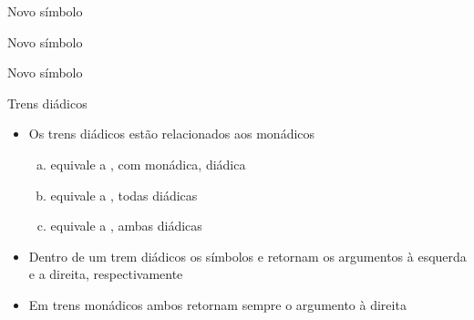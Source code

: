 \begin{frame}[fragile]{Novo símbolo}


\end{frame}

\begin{frame}[fragile]{Novo símbolo}

\end{frame}

\begin{frame}[fragile]{Novo símbolo}

\end{frame}


\begin{frame}[fragile]{Trens diádicos}

    \begin{itemize}
        \item Os trens diádicos estão relacionados aos monádicos
        \pause

        \begin{enumerate}[(a)]
            \item {} equivale a , com  monádica,
 diádica
        \pause

            \item {} equivale a , todas diádicas
        \pause
            \item {} equivale a , ambas diádicas
        \end{enumerate}
        \pause

        \item Dentro de um trem diádicos os símbolos  e  retornam os argumentos à esquerda e a direita, respectivamente
        \pause

        \item Em trens monádicos ambos retornam sempre o argumento à direita
 
    \end{itemize}

\end{frame}

